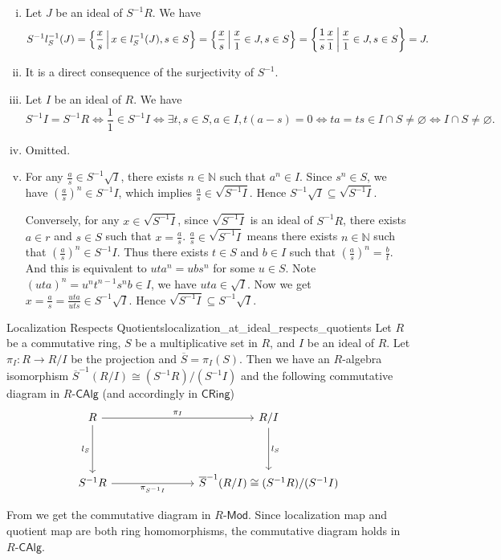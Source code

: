 \begin{prf}
    \begin{enumerate}[(i)]
        \item Let $J$ be an ideal of $S^{-1}R$. We have
        \[
            S^{-1}l_S^{-1}(J)=\left\{\frac{x}{s}\,\middle\vert\, x\in l_S^{-1}(J),s\in S\right\}=\left\{\frac{x}{s}\,\middle\vert\, \frac{x}{1}\in J,s\in S\right\}=\left\{\frac{1}{s}\frac{x}{1}\,\middle\vert\, \frac{x}{1}\in J,s\in S\right\}=J.
        \]
        \item It is a direct consequence of the surjectivity of $S^{-1}$.
        \item Let $I$ be an ideal of $R$. We have
        \[
            S^{-1}I=S^{-1}R\iff \frac{1}{1} \in S^{-1}I \iff \exists t,s\in S,a\in I, t(a-s)=0\iff ta=ts\in I\cap S\ne\varnothing \iff I\cap S\ne\varnothing.
        \]
        \item Omitted.
        \item For any $\frac{a}{s} \in S^{-1}\sqrt{I}$, there exists $n \in \mathbb{N}$ such that $a^n \in I$. Since $s^n \in S$, we have $\left(\frac{a}{s}\right)^n \in S^{-1}I$, which implies $\frac{a}{s} \in \sqrt{S^{-1}I}$. Hence $S^{-1}\sqrt{I} \subseteq \sqrt{S^{-1}I}$.

        Conversely, for any $x \in \sqrt{S^{-1}I}$, since $\sqrt{S^{-1}I}$ is an ideal of $S^{-1}R$, there exists $a\in r$ and $s\in S$ such that $x=\frac{a}{s}$. $\frac{a}{s}\in \sqrt{S^{-1}I}$ means there exists $n \in \mathbb{N}$ such that $\left(\frac{a}{s}\right)^n \in S^{-1}I$. Thus there exists $t \in S$ and $b\in I$ such that $\left(\frac{a}{s}\right)^n =\frac{b}{t}$. And this is equivalent to $uta^n =ubs^n$ for some $u\in S$. Note $(uta)^n=u^nt^{n-1}s^nb\in I$, we have $uta\in\sqrt{I}$. Now we get $x=\frac{a}{s} =\frac{uta}{uts}\in S^{-1}\sqrt{I}$. Hence $\sqrt{S^{-1}I} \subseteq S^{-1}\sqrt{I}$.
    \end{enumerate}
\end{prf}


\begin{proposition}{Localization Respects Quotients}{localization_at_ideal_respects_quotients}
    Let $R$ be a commutative ring, $S$ be a multiplicative set in $R$, and $I$ be an ideal of $R$. Let $\pi_I:R\to R/I$ be the projection and $\overline{S}=\pi_I(S)$. Then we have an $R$-algebra isomorphism $\overline{S}^{-1}(R/I)\cong (S^{-1}R)/(S^{-1}I)$ and the following commutative diagram in $R\text{-}\mathsf{CAlg}$ (and accordingly in $\mathsf{CRing}$)
    \[
        \begin{tikzcd}
            R \arrow[r, "\pi_I"] \arrow[d, "l_S"'] &[+5em] R/I \arrow[d, "l_S"]              \\[+2em]
            S^{-1}R \arrow[r, "\pi_{S^{-1}I}"']       & \overline{S}^{-1}(R/I)\cong (S^{-1}R)/(S^{-1}I)
            \end{tikzcd}
    \]
\end{proposition}
\begin{prf}
    From  we get the commutative diagram in $R\text{-}\mathsf{Mod}$. Since localization map and quotient map are both ring homomorphisms, the commutative diagram holds in $R\text{-}\mathsf{CAlg}$.
\end{prf}




